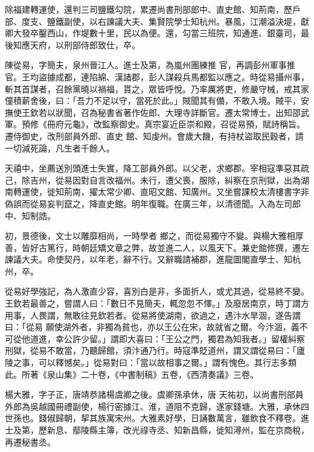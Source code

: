 \begin{pinyinscope}
 除福建轉運使，還判三司鹽鐵勾院，累遷尚書刑部郎中、直史館、知荊南，歷戶部、度支、鹽鐵副使，以右諫議大夫、集賢院學士知杭州。暴風，江潮溢決堤，獻卿大發卒鑿西山，作堤數十里，民以為便。還，勾當三班院，知通進、銀臺司，最後知應天府，以刑部侍郎致仕，卒。



 陳從易，字簡夫，泉州晉江人。進士及第，為嵐州團練推
 官，再調彭州軍事推官。王均盜據成都，連陷綿、漢諸郡，彭人謀殺兵馬都監以應之。時從易攝州事，斬其首謀者，召餘黨曉以禍福，貰之，眾皆呼悅。乃率厲將吏，修嚴守械，戒其家僮積薪舍後，曰：「吾力不足以守，當死於此。」賊聞其有備，不敢入境。賊平，安撫使王欽若以狀聞，召為秘書省著作佐郎、大理寺詳斷官。遷太常博士，出知邵武軍。預修《冊府元龜》，改監察御史。真宗宴近臣崇和殿，召從易預，賦詩稱旨。遷侍御史，改刑部員外郎、直史
 館、知虔州。會歲大饑，有持杖盜取民穀者，請一切減死論，凡生者千餘人。



 天禧中，坐薦送別頭進士失實，降工部員外郎。以父老，求鄉郡。宰相寇準惡其疏己，除吉州，從易因對自言改福州。未行，遭父喪，服除，糾察在京刑獄，出為湖南轉運使，徙知荊南，擢太常少卿、直昭文館、知廣州。又坐嘗課校太清樓書字非偽誤而從易妄判竄之，降直史館。明年復職。在廣三年，以清德聞。入為左司郎中、知制誥。



 初，景德後，文士以雕靡相尚，一時學者
 鄉之，而從易獨守不變。與楊大雅相厚善，皆好古篤行，時朝廷矯文章之弊，故並進二人，以風天下。兼史館修撰，遷左諫議大夫。命使契丹，以年老，辭不行。又辭職請補郡，進龍圖閣直學士、知杭州，卒。



 從易好學強記，為人激直少容，喜別白是非，多面折人，或尤其過，從易終不變。王欽若最善之，嘗謂人曰：「數日不見簡夫，輒忽忽不懌。」及廢居南京，時丁謂方用事，人畏謂，無敢往見欽若者。從易將使湖南，欲過之，遇汴水旱涸，遂告謂曰：「從易
 願使湖外者，非獨為貧也，亦以王公在宋，故就省之爾。今汴涸，義不可從他道進，幸公許少留。」謂即大喜曰：「王公之門，獨君為知我者。」留權糾察刑獄，從易不敢當，乃聽歸館，須汴通乃行。時寇準貶道州，謂又謂從易曰：「廬陵之事，可以釋憾矣。」從易對曰：「當以故相事之爾。」謂有愧色。其行志多類此。所著《泉山集》二十卷，《中書制稿》五卷，《西清奏議》三卷。



 楊大雅，字子正，唐靖恭諸楊虞卿之後。虞卿孫承休，唐
 天祐初，以尚書刑部員外郎為吳越國冊禮副使，楊行密據江、淮，道阻不克歸，遂家錢塘。大雅，承休四世孫也。錢俶歸朝，挈其族寓宋州。大雅素好學，日誦數萬言，雖飲食不釋卷。進士及第，歷新息、鄢陵縣主簿，改光祿寺丞、知新昌縣，徙知潯州，監在京商稅，再遷秘書丞。




\end{pinyinscope}

